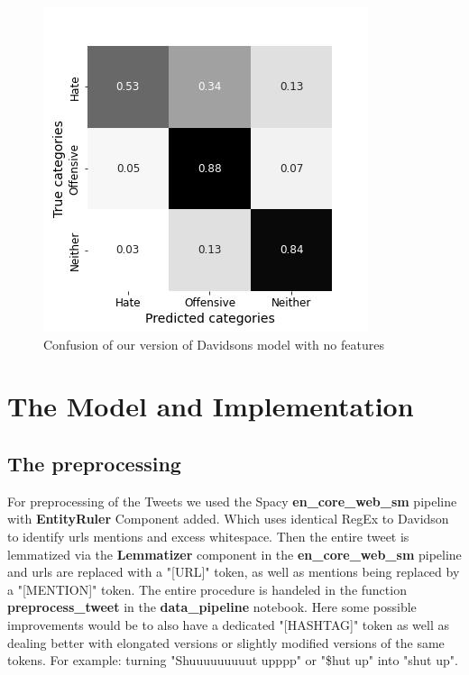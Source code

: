 \documentclass[11pt,a4paper]{article}
\begin{document}
\begin{figure}[h]
  \includegraphics[width=\linewidth]{./tables-figures/nofeat_confusion.jpg}
  \caption{Confusion of our version of Davidsons model with no features}
  \label{fig:nofeature_confusion}
\end{figure}

\section{The Model and Implementation}

\subsection{The preprocessing}
For preprocessing of the Tweets we used the Spacy \textbf{en\_core\_web\_sm} pipeline with \textbf{EntityRuler} Component added.
Which uses identical RegEx to Davidson to identify urls mentions and excess whitespace.
Then the entire tweet is lemmatized via the \textbf{Lemmatizer} component in the \textbf{en\_core\_web\_sm} pipeline and urls 
are replaced with a "[URL]" token, as well as mentions being replaced by a "[MENTION]" token.
The entire procedure is handeled in the function \textbf{preprocess\_tweet} in the \textbf{data\_pipeline} notebook.
Here some possible improvements would be to also have a dedicated "[HASHTAG]" token as well as dealing better with elongated
versions or slightly modified versions of the same tokens. 
For example: turning "Shuuuuuuuuut upppp" or "\$hut up" into "shut up".
\end{document}
